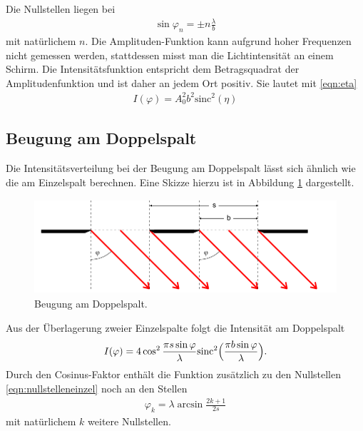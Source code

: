 \FloatBarrier

Die Nullstellen liegen bei
\begin{align}
  \sin{\varphi_n} = \pm n \frac{\lambda}{b}
  \label{eqn:nullstelleneinzel}
\end{align}
mit natürlichem $n$.
Die Amplituden-Funktion kann aufgrund hoher Frequenzen nicht gemessen werden,
stattdessen misst man die Lichtintensität an einem Schirm.
Die Intensitätsfunktion entspricht dem Betragsquadrat der Amplitudenfunktion
und ist daher an jedem Ort positiv.
Sie lautet mit \eqref{eqn:eta}
\begin{align}
  I(\varphi) = A_0^2 b^2 \text{sinc}^2(\eta)
  \label{eqn:intensitaeteinzel}
\end{align}


\subsection{Beugung am Doppelspalt}

Die Intensitätsverteilung bei der Beugung am Doppelspalt lässt sich ähnlich
wie die am Einzelspalt berechnen.
Eine Skizze hierzu ist in Abbildung \ref{fig:doppelspalt} dargestellt.

\begin{figure}
  \centering
  \includegraphics[height=3.5cm]{MeinePics/doppelspalt.png}
  \caption{Beugung am Doppelspalt.\cite{anleitung}}
  \label{fig:doppelspalt}
\end{figure}

\FloatBarrier

Aus der Überlagerung zweier Einzelspalte folgt die Intensität am Doppelspalt
\begin{align}
  I(\varphi) = 4 \cos^2{\frac{\pi s \sin{\varphi}}{\lambda}}
  \text{sinc}^2\Bigl(\frac{\pi b \sin{\varphi}}{\lambda}\Bigr).
  \label{eqn:intensdoppel}
\end{align}
Durch den Cosinus-Faktor enthält die Funktion zusätzlich zu den Nullstellen
\eqref{eqn:nullstelleneinzel} noch an den Stellen
\begin{align}
  \varphi_k = \lambda \arcsin{\frac{2k+1}{2s}}
\end{align}
mit natürlichem $k$ weitere Nullstellen.


